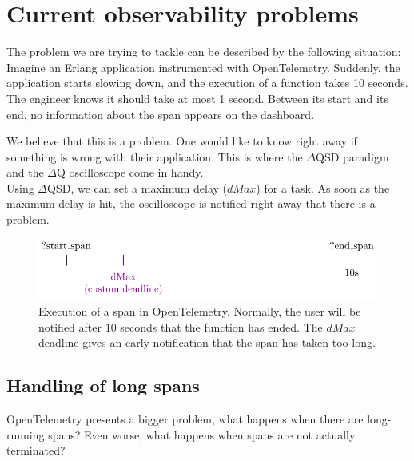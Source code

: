 \section{Current observability problems}
    The problem we are trying to tackle can be described by the following situation: 
    Imagine an Erlang application instrumented with OpenTelemetry. Suddenly, the application starts slowing down, and the execution of a function takes 10 seconds. The engineer knows it should take at most 1 second. Between its start and its end, no information about the span appears on the dashboard.
    
    We believe that this is a problem. One would like to know right away if something is wrong with their application. This is where the $\Delta$QSD paradigm and the $\Delta$Q oscilloscope come in handy. \\ 
   Using $\Delta$QSD, we can set a maximum delay ($dMax$) for a task. As soon as the maximum delay is hit, the oscilloscope is notified right away that there is a problem.
   
   \begin{figure}[H]
        \begin{center}
            \includegraphics{tikz/start_end_dmax.pdf}
        \end{center}
        \caption{Execution of a span in OpenTelemetry. Normally, the user will be notified after 10 seconds that the function has ended. The $dMax$ deadline gives an early notification that the span has taken too long.}
        \label{fig:otel_dmax}
    \end{figure} 


    \subsection{Handling of long spans}
        OpenTelemetry presents a bigger problem, what happens when there are long-running spans? Even worse, what happens when spans are not actually terminated?
        
